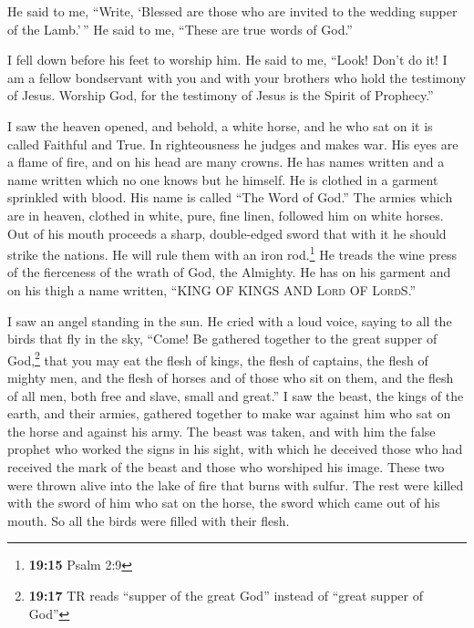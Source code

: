 \begin{paracol}{2}
\begin{otherlanguage}{english}
 He said to me, ``Write, `Blessed are those who are
invited to the wedding supper of the Lamb.'\,'' He said to me, ``These
are true words of God.''

 I fell down before his feet to worship him. He said to
me, ``Look! Don't do it! I am a fellow bondservant with you and with
your brothers who hold the testimony of Jesus. Worship God, for the
testimony of Jesus is the Spirit of Prophecy.''

 I saw the heaven opened, and behold, a white horse, and
he who sat on it is called Faithful and True. In righteousness he judges
and makes war.  His eyes are a flame of fire, and on his
head are many crowns. He has names written and a name written which no
one knows but he himself.  He is clothed in a garment
sprinkled with blood. His name is called ``The Word of God.''
 The armies which are in heaven, clothed in white, pure,
fine linen, followed him on white horses.  Out of his
mouth proceeds a sharp, double-edged sword that with it he should strike
the nations. He will rule them with an iron rod.\footnote{\textbf{19:15}
  Psalm 2:9} He treads the wine press of the fierceness of the wrath of
God, the Almighty.  He has on his garment and on his
thigh a name written, ``KING OF KINGS AND \textsc{Lord} OF
\textsc{Lord}S.''

 I saw an angel standing in the sun. He cried with a loud
voice, saying to all the birds that fly in the sky, ``Come! Be gathered
together to the great supper of God,\footnote{\textbf{19:17} TR reads
  ``supper of the great God'' instead of ``great supper of God''}
 that you may eat the flesh of kings, the flesh of
captains, the flesh of mighty men, and the flesh of horses and of those
who sit on them, and the flesh of all men, both free and slave, small
and great.''  I saw the beast, the kings of the earth,
and their armies, gathered together to make war against him who sat on
the horse and against his army.  The beast was taken, and
with him the false prophet who worked the signs in his sight, with which
he deceived those who had received the mark of the beast and those who
worshiped his image. These two were thrown alive into the lake of fire
that burns with sulfur.  The rest were killed with the
sword of him who sat on the horse, the sword which came out of his
mouth. So all the birds were filled with their flesh.


\end{otherlanguage}
\end{paracol}
